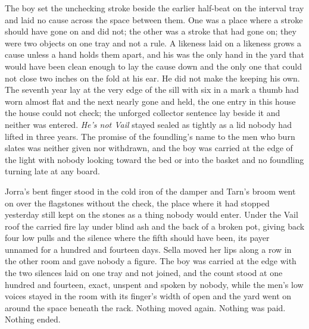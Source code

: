 The boy set the unchecking stroke beside the earlier half-beat on the interval tray and laid no cause across the space between them. One was a place where a stroke should have gone on and did not; the other was a stroke that had gone on; they were two objects on one tray and not a rule. A likeness laid on a likeness grows a cause unless a hand holds them apart, and his was the only hand in the yard that would have been clean enough to lay the cause down and the only one that could not close two inches on the fold at his ear. He did not make the keeping his own. The seventh year lay at the very edge of the sill with six in a mark a thumb had worn almost flat and the next nearly gone and held, the one entry in this house the house could not check; the unforged collector sentence lay beside it and neither was entered. \emph{He's not Vail} stayed sealed as tightly as a lid nobody had lifted in three years. The promise of the foundling's name to the men who burn slates was neither given nor withdrawn, and the boy was carried at the edge of the light with nobody looking toward the bed or into the basket and no foundling turning late at any board.

Jorra's bent finger stood in the cold iron of the damper and Tarn's broom went on over the flagstones without the check, the place where it had stopped yesterday still kept on the stones as a thing nobody would enter. Under the Vail roof the carried fire lay under blind ash and the back of a broken pot, giving back four low pulls and the silence where the fifth should have been, its payer unnamed for a hundred and fourteen days. Sella moved her lips along a row in the other room and gave nobody a figure. The boy was carried at the edge with the two silences laid on one tray and not joined, and the count stood at one hundred and fourteen, exact, unspent and spoken by nobody, while the men's low voices stayed in the room with its finger's width of open and the yard went on around the space beneath the rack. Nothing moved again. Nothing was paid. Nothing ended.
